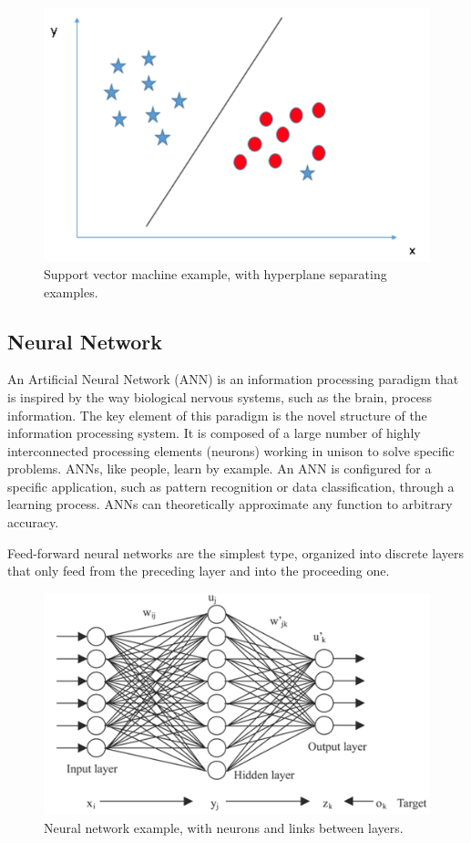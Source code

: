 \documentclass[format=acmlarge]{acmart}
\begin{document}
\begin{figure}
  \includegraphics{svm-example}
  \caption{Support vector machine example, with hyperplane separating examples.}
  \label{fig:one}
\end{figure}

\subsection{Neural Network}
An Artificial Neural Network (ANN) is an information processing paradigm that is inspired by the way biological nervous systems, such as the brain, process information. The key element of this paradigm is the novel structure of the information processing system. It is composed of a large number of highly interconnected processing elements (neurons) working in unison to solve specific problems. ANNs, like people, learn by example. An ANN is configured for a specific application, such as pattern recognition or data classification, through a learning process. ANNs can theoretically approximate any function to arbitrary accuracy.

Feed-forward neural networks are the simplest type, organized into discrete layers that only feed from the preceding layer and into the proceeding one.

\begin{figure}
  \includegraphics{nn-example}
  \caption{Neural network example, with neurons and links between layers.}
  \label{fig:two}
\end{figure}
\end{document}
